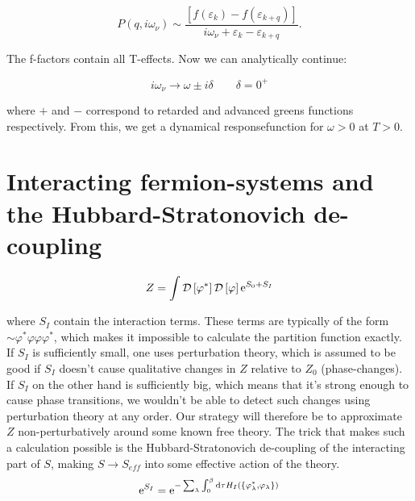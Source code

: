 \begin{equation*}
    P(q,i\omega_\nu)  \sim \frac{\left[ f(\varepsilon_k) - f(\varepsilon_{k+q})\right]}{i\omega_\nu + \varepsilon_k - \varepsilon_{k+q}}. 
\end{equation*}

The f-factors contain all T-effects. Now we can analytically continue: 

\begin{equation*}
    i\omega_\nu \to \omega \pm i\delta \quad \quad \delta = 0^{+}
\end{equation*}

where $+$ and $-$ correspond to retarded and advanced greens functions respectively. From this, we get a dynamical responsefunction for $\omega > 0$ at $T > 0$. 

\section{Interacting fermion-systems and the Hubbard-Stratonovich de-coupling}

\begin{equation*}
    Z = \int \mathcal{D} \left[ \varphi^*\right] \mathcal{D} \left[\varphi\right] \mathrm{e}^{S_0 + S_I}
\end{equation*}

where $S_I$ contain the interaction terms. These terms are typically of the form $\sim \varphi^*\varphi \varphi \varphi^*$, which makes it impossible to calculate the partition function exactly. If $S_I$ is sufficiently small, one uses perturbation theory, which is assumed to be good if $S_I$ doesn't cause qualitative changes in $Z$ relative to $Z_0$ (phase-changes). \\ 

If $S_I$ on the other hand is sufficiently big, which means that it's strong enough to cause phase transitions, we wouldn't be able to detect such changes using perturbation theory at any order. Our strategy will therefore be to approximate $Z$ non-perturbatively around some known free theory. The trick that makes such a calculation possible is the Hubbard-Stratonovich de-coupling of the interacting part of $S$, making $S \to S_{eff}$ into some effective action of the theory. \\

\begin{equation*}
    \mathrm{e}^{S_I} = \mathrm{e}^{-\sum_\lambda \int_{0}^{\beta} \dd \tau H_I(\{ \varphi^*_\lambda, \varphi_\lambda\})}
\end{equation*}

